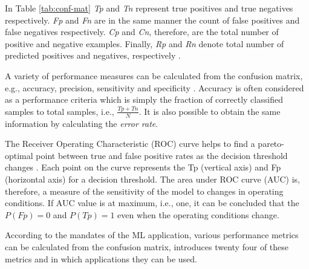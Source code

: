 In Table \ref{tab:conf-mat} \textit{Tp} and \textit{Tn} represent true positives and true negatives respectively. \textit{Fp} and \textit{Fn} are in the same manner the count of false positives and false negatives respectively. \textit{Cp} and \textit{Cn}, therefore, are the total number of positive and negative examples. Finally, \textit{Rp} and \textit{Rn} denote total number of predicted positives and negatives, respectively \cite{Bradley1997}.

A variety of performance measures can be calculated from the confusion matrix, e.g., accuracy, precision, sensitivity and specificity \cite{Bradley1997}. Accuracy is often considered as a performance criteria which is simply the fraction of correctly classified samples to total samples, i.e., {\large $\frac{Tp + Tn}{N}$}. It is also possible to obtain the same information by calculating the \textit{error rate}.

The Receiver Operating Characteristic (ROC) curve helps to find a pareto-optimal point between true and false positive rates as the decision threshold changes \cite{Bradley1997}. Each point on the curve represents the Tp (vertical axis) and Fp (horizontal axis) for a decision threshold. The area under ROC curve (AUC) is, therefore, a measure of the sensitivity of the model to changes in operating conditions. If AUC value is at maximum, i.e., one, it can be concluded that the $P(Fp) = 0$ and $P(Tp) = 1$ even when the operating conditions change.

According to the mandates of the ML application, various performance metrics can be calculated from the confusion matrix, \cite{Sokolva2008} introduces twenty four of these metrics and in which applications they can be used.
